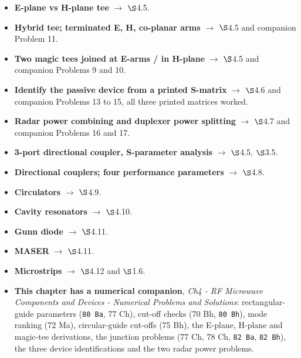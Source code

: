 \begin{itemize}
    $\rightarrow$ $\S$4.5 and companion Problems 6 and 7. 
  \item \textbf{E-plane vs H-plane tee} $\rightarrow$ $\S$4.5. 
  \item \textbf{Hybrid tee; terminated E, H, co-planar arms} $\rightarrow$ $\S$4.5 and
    companion Problem 11. 
  \item \textbf{Two magic tees joined at E-arms / in H-plane} $\rightarrow$ $\S$4.5 and
    companion Problems 9 and 10. 
  \item \textbf{Identify the passive device from a printed S-matrix} $\rightarrow$
    $\S$4.6 and companion Problems 13 to 15, all three printed matrices worked.
  \item \textbf{Radar power combining and duplexer power splitting} $\rightarrow$ $\S$4.7
    and companion Problems 16 and 17.
  \item \textbf{3-port directional coupler, S-parameter analysis} $\rightarrow$ $\S$4.5,
    $\S$3.5. 
  \item \textbf{Directional couplers; four performance parameters} $\rightarrow$ $\S$4.8.
  \item \textbf{Circulators} $\rightarrow$ $\S$4.9. 
  \item \textbf{Cavity resonators} $\rightarrow$ $\S$4.10. 
  \item \textbf{Gunn diode} $\rightarrow$ $\S$4.11. 
  \item \textbf{MASER} $\rightarrow$ $\S$4.11. 
  \item \textbf{Microstrips} $\rightarrow$ $\S$4.12 and $\S$1.6. 
\end{itemize}

\begin{itemize}
  \item \textbf{This chapter has a numerical companion}, \textit{Ch4 - RF Microwave Components
    and Devices - Numerical Problems and Solutions}: rectangular-guide parameters
    (\texttt{80 Ba}, 77 Ch), cut-off checks (70 Bh, \texttt{80 Bh}), mode ranking (72 Ma),
    circular-guide cut-offs (75 Bh), the E-plane, H-plane and magic-tee derivations,
    the junction problems (77 Ch, 78 Ch, \texttt{82 Ba}, \texttt{82 Bh}), the three
    device identifications and the two radar power problems.
\end{itemize}

